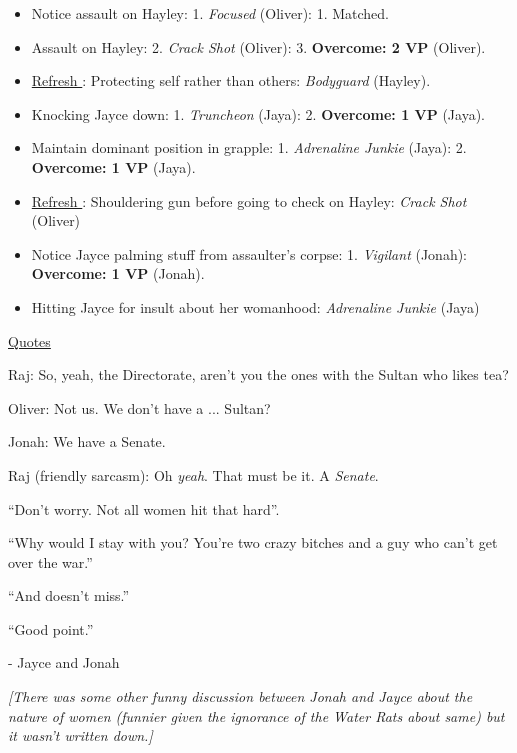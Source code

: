 \begin{itemize}
\item Notice assault on Hayley: 1.  \textit{Focused} (Oliver): 1.  Matched.
\item Assault on Hayley: 2.\textit{  Crack Shot} (Oliver): 3.  \textbf{Overcome: 2 VP} (Oliver).
\item \underline{ Refresh }: Protecting self rather than others:\textit{ Bodyguard} (Hayley).
\item Knocking Jayce down: 1.  \textit{Truncheon} (Jaya): 2.  \textbf{Overcome: 1 VP} (Jaya).
\item Maintain dominant position in grapple: 1.  \textit{Adrenaline Junkie} (Jaya): 2.  \textbf{Overcome: 1 VP} (Jaya).
\item \underline{ Refresh }: Shouldering gun before going to check on Hayley:\textit{ Crack Shot} (Oliver)
\item Notice Jayce palming stuff from assaulter's corpse: 1.  \textit{Vigilant} (Jonah):  \textbf{Overcome: 1 VP} (Jonah).
\item Hitting Jayce for insult about her womanhood:\textit{ Adrenaline Junkie} (Jaya)
\end{itemize}



\underline{  {\LARGE Quotes }  }



Raj: So, yeah, the Directorate, aren't you the ones with the Sultan who likes tea?

Oliver: Not us.   We don't have a ...  Sultan?

Jonah: We have a Senate.

Raj (friendly sarcasm): Oh\textit{ yeah}.  That must be it.  A\textit{ Senate}.



``Don't worry.  Not all women hit that hard''.




``Why would I stay with you?  You're two crazy bitches and a guy who can't get over the war.''

``And doesn't miss.''

``Good point.''

                - Jayce and Jonah



\textit{{[}}\textit{There was some other funny discussion between Jonah and Jayce about the nature of women (funnier given the ignorance of the Water Rats about same) but it wasn't written down.{]}}


